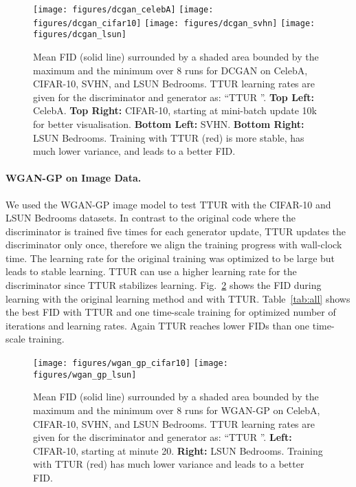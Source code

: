 \documentclass{article}
\begin{document}
\begin{figure} \centering
\texttt{[image: figures/dcgan\_celebA]}
\texttt{[image: figures/dcgan\_cifar10]}
\texttt{[image: figures/dcgan\_svhn]}
\texttt{[image: figures/dcgan\_lsun]} \caption[FID for
DCGAN on CelebA, CIFAR-10, SVHN, and LSUN Bedrooms.]{Mean FID (solid line)
surrounded by a shaded area bounded by the maximum and the minimum over 8 runs for DCGAN on
CelebA, CIFAR-10, SVHN, and LSUN Bedrooms.
TTUR learning rates are given for the discriminator  and generator
 as: ``TTUR  ''. {\bf Top Left:} CelebA. {\bf Top
Right:} CIFAR-10, starting at mini-batch update 10k for better visualisation.
{\bf Bottom Left:} SVHN. {\bf Bottom Right:} LSUN Bedrooms.
Training with TTUR (red) is more stable, has much lower variance, and leads to a better FID.
  \label{fig:dcgan} }
\end{figure}

\paragraph{WGAN-GP on Image Data.}

We used the WGAN-GP image model \cite{Gulrajani:17} to test TTUR with the
CIFAR-10 and LSUN Bedrooms datasets. In contrast to the original code where the
discriminator is trained five times for each generator update, TTUR updates the discriminator
only once, therefore we align the training progress with wall-clock time. The
learning rate for the original training was optimized to be large but leads to
stable learning. TTUR can use a higher learning rate for the discriminator since
TTUR stabilizes learning. Fig.~\ref{fig:wgan_gp} shows the FID
during learning with the original learning method and
with TTUR. Table~\ref{tab:all} shows the
best FID with TTUR and one time-scale training for optimized number of iterations and
learning rates. Again TTUR reaches lower FIDs than one time-scale training.

\begin{figure}[H]
\centering
\texttt{[image: figures/wgan\_gp\_cifar10]}
\texttt{[image: figures/wgan\_gp\_lsun]} \caption[FID for
WGAN-GP trained on CIFAR-10 and LSUN Bedrooms.]{Mean FID (solid line)
surrounded by a shaded area bounded by the maximum and the minimum over 8 runs for WGAN-GP on
CelebA, CIFAR-10, SVHN, and LSUN Bedrooms.
TTUR learning rates are given for the discriminator  and generator
 as: ``TTUR  ''.
{\bf Left:} CIFAR-10, starting at minute 20. {\bf Right:} LSUN
Bedrooms. Training with TTUR (red) has much lower variance and leads to a better FID.
  \label{fig:wgan_gp} }
\end{figure}
\end{document}
